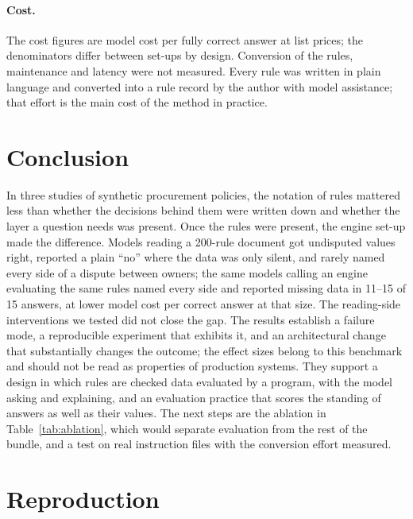 \documentclass[11pt]{article}
\begin{document}
\paragraph{Cost.} The cost figures are model cost per fully correct answer at list prices; the denominators differ
between set-ups by design. Conversion of the rules, maintenance and latency were not measured. Every rule was written
in plain language and converted into a rule record by the author with model assistance; that effort is the main
cost of the method in practice.

\section{Conclusion}

In three studies of synthetic procurement policies, the notation of rules mattered less than whether the decisions
behind them were written down and whether the layer a question needs was present. Once the rules were present, the engine set-up made the difference. Models reading a 200-rule document got undisputed values right, reported a plain
``no'' where the data was only silent, and rarely named every side of a dispute between owners; the same models
calling an engine evaluating the same rules named every side and reported missing data in 11--15 of 15 answers, at
lower model cost per correct answer at that size. The reading-side interventions we tested did not close the gap.
The results establish a failure mode, a reproducible experiment that exhibits it, and an architectural change that substantially changes the outcome; the effect sizes belong to this benchmark and should not be read as properties of production systems. They support a design in which rules are checked data evaluated by a program, with the model asking and explaining, and an evaluation practice that scores the standing of answers as well as their values. The next steps are the ablation in Table~\ref{tab:ablation}, which would separate evaluation from the rest of the bundle, and a test on real instruction files with the conversion effort measured.

\appendix

\section{Reproduction}
\label{app:repro}
\end{document}
